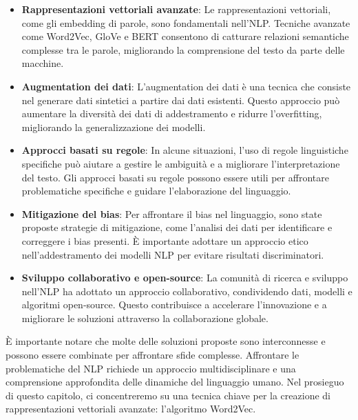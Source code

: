 \begin{itemize}
    \item \textbf{Rappresentazioni vettoriali avanzate}: Le rappresentazioni vettoriali, come gli embedding di parole, sono fondamentali nell'NLP. Tecniche avanzate come Word2Vec, GloVe e BERT consentono di catturare relazioni semantiche complesse tra le parole, migliorando la comprensione del testo da parte delle macchine.

    \item \textbf{Augmentation dei dati}: L'augmentation dei dati è una tecnica che consiste nel generare dati sintetici a partire dai dati esistenti. Questo approccio può aumentare la diversità dei dati di addestramento e ridurre l'overfitting, migliorando la generalizzazione dei modelli.

    \item \textbf{Approcci basati su regole}: In alcune situazioni, l'uso di regole linguistiche specifiche può aiutare a gestire le ambiguità e a migliorare l'interpretazione del testo. Gli approcci basati su regole possono essere utili per affrontare problematiche specifiche e guidare l'elaborazione del linguaggio.

    \item \textbf{Mitigazione del bias}: Per affrontare il bias nel linguaggio, sono state proposte strategie di mitigazione, come l'analisi dei dati per identificare e correggere i bias presenti. È importante adottare un approccio etico nell'addestramento dei modelli NLP per evitare risultati discriminatori.

    \item \textbf{Sviluppo collaborativo e open-source}: La comunità di ricerca e sviluppo nell'NLP ha adottato un approccio collaborativo, condividendo dati, modelli e algoritmi open-source. Questo contribuisce a accelerare l'innovazione e a migliorare le soluzioni attraverso la collaborazione globale.
\end{itemize}
È importante notare che molte delle soluzioni proposte sono interconnesse e possono essere combinate per affrontare sfide complesse. Affrontare le problematiche del NLP richiede un approccio multidisciplinare e una comprensione approfondita delle dinamiche del linguaggio umano. Nel prosieguo di questo capitolo, ci concentreremo su una tecnica chiave per la creazione di rappresentazioni vettoriali avanzate: l'algoritmo Word2Vec.